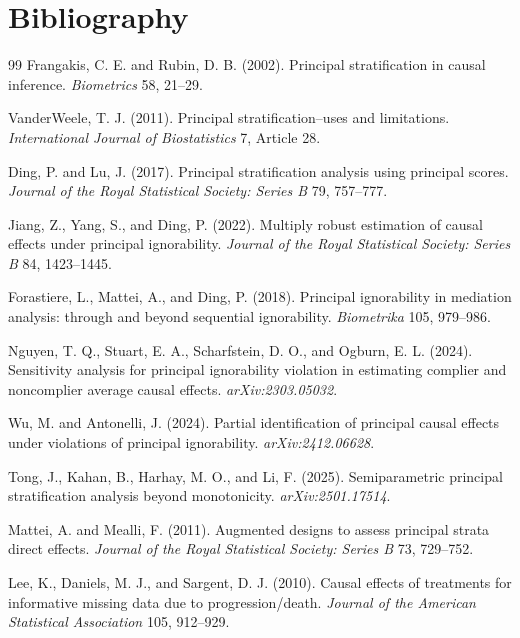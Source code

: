 \documentclass[11pt]{article}
\theoremstyle{definition}
\theoremstyle{plain}
\theoremstyle{remark}
\begin{document}
\section*{Bibliography}
\begin{thebibliography}{99}
Frangakis, C. E. and Rubin, D. B. (2002).
Principal stratification in causal inference.
\emph{Biometrics} 58, 21--29.

VanderWeele, T. J. (2011).
Principal stratification--uses and limitations.
\emph{International Journal of Biostatistics} 7, Article 28.

Ding, P. and Lu, J. (2017).
Principal stratification analysis using principal scores.
\emph{Journal of the Royal Statistical Society: Series B} 79, 757--777.

Jiang, Z., Yang, S., and Ding, P. (2022).
Multiply robust estimation of causal effects under principal ignorability.
\emph{Journal of the Royal Statistical Society: Series B} 84, 1423--1445.

Forastiere, L., Mattei, A., and Ding, P. (2018).
Principal ignorability in mediation analysis: through and beyond sequential ignorability.
\emph{Biometrika} 105, 979--986.

Nguyen, T. Q., Stuart, E. A., Scharfstein, D. O., and Ogburn, E. L. (2024).
Sensitivity analysis for principal ignorability violation in estimating complier and noncomplier average causal effects.
\emph{arXiv:2303.05032}.

Wu, M. and Antonelli, J. (2024).
Partial identification of principal causal effects under violations of principal ignorability.
\emph{arXiv:2412.06628}.

Tong, J., Kahan, B., Harhay, M. O., and Li, F. (2025).
Semiparametric principal stratification analysis beyond monotonicity.
\emph{arXiv:2501.17514}.

Mattei, A. and Mealli, F. (2011).
Augmented designs to assess principal strata direct effects.
\emph{Journal of the Royal Statistical Society: Series B} 73, 729--752.

Lee, K., Daniels, M. J., and Sargent, D. J. (2010).
Causal effects of treatments for informative missing data due to progression/death.
\emph{Journal of the American Statistical Association} 105, 912--929.


\end{thebibliography}
\end{document}
